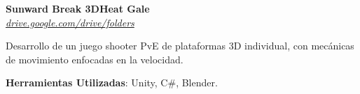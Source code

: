 \begin{onecolentry}
    \textbf{Sunward Break 3D\@ Heat Gale} \\
    \textit{\href{https://drive.google.com/drive/folders/1qxCw2BFty3NAGFAy8rxgdD7cgBjDTLI4?usp=sharing}{drive.google.com/drive/folders}}
\end{onecolentry}

\vspace{0.20 cm}
\begin{onecolentry}
    \begin{highlights}        
        \item Desarrollo de un juego shooter PvE de plataformas 3D individual, con mecánicas de movimiento enfocadas en la velocidad.
        \item \textbf{Herramientas Utilizadas}: Unity, C\#, Blender.
    \end{highlights}
\end{onecolentry}
